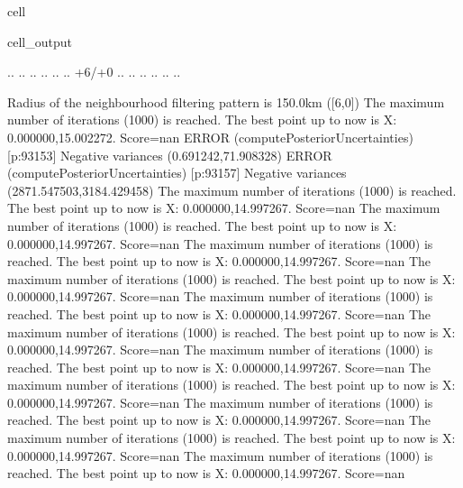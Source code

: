 \documentclass[letterpaper,10pt,english]{jupyterBook}
\begin{document}
\begin{sphinxuseclass}{cell}
\begin{sphinxVerbatimOutput}
\begin{sphinxuseclass}{cell_output}
\begin{sphinxVerbatim}[commandchars=\\\{\}]
 .\PYGZus{}\PYGZus{}\PYGZus{}\PYGZus{}\PYGZus{}. .\PYGZus{}\PYGZus{}\PYGZus{}\PYGZus{}\PYGZus{}. .\PYGZus{}\PYGZus{}\PYGZus{}\PYGZus{}\PYGZus{}. .\PYGZus{}\PYGZus{}\PYGZus{}\PYGZus{}\PYGZus{}. .\PYGZus{}\PYGZus{}\PYGZus{}\PYGZus{}\PYGZus{}. .\PYGZus{}\PYGZus{}\PYGZus{}\PYGZus{}\PYGZus{}. \PYGZob{}+6/+0\PYGZcb{} .\PYGZus{}\PYGZus{}\PYGZus{}\PYGZus{}\PYGZus{}. .\PYGZus{}\PYGZus{}\PYGZus{}\PYGZus{}\PYGZus{}. .\PYGZus{}\PYGZus{}\PYGZus{}\PYGZus{}\PYGZus{}. .\PYGZus{}\PYGZus{}\PYGZus{}\PYGZus{}\PYGZus{}. .\PYGZus{}\PYGZus{}\PYGZus{}\PYGZus{}\PYGZus{}. .\PYGZus{}\PYGZus{}\PYGZus{}\PYGZus{}\PYGZus{}. 



	Radius of the neighbourhood filtering pattern is 150.0km ([\PYGZhy{}6,0])
The maximum number of iterations (1000) is reached. The best point up to now is X: \PYGZob{}0.000000,15.002272\PYGZcb{}. Score=\PYGZhy{}nan
ERROR (compute\PYGZus{}Posterior\PYGZus{}Uncertainties) [p:93153] Negative variances (\PYGZhy{}0.691242,71.908328)
ERROR (compute\PYGZus{}Posterior\PYGZus{}Uncertainties) [p:93157] Negative variances (2871.547503,\PYGZhy{}3184.429458)
The maximum number of iterations (1000) is reached. The best point up to now is X: \PYGZob{}0.000000,14.997267\PYGZcb{}. Score=\PYGZhy{}nan
The maximum number of iterations (1000) is reached. The best point up to now is X: \PYGZob{}0.000000,14.997267\PYGZcb{}. Score=\PYGZhy{}nan
The maximum number of iterations (1000) is reached. The best point up to now is X: \PYGZob{}0.000000,14.997267\PYGZcb{}. Score=\PYGZhy{}nan
The maximum number of iterations (1000) is reached. The best point up to now is X: \PYGZob{}0.000000,14.997267\PYGZcb{}. Score=\PYGZhy{}nan
The maximum number of iterations (1000) is reached. The best point up to now is X: \PYGZob{}0.000000,14.997267\PYGZcb{}. Score=\PYGZhy{}nan
The maximum number of iterations (1000) is reached. The best point up to now is X: \PYGZob{}0.000000,14.997267\PYGZcb{}. Score=\PYGZhy{}nan
The maximum number of iterations (1000) is reached. The best point up to now is X: \PYGZob{}0.000000,14.997267\PYGZcb{}. Score=\PYGZhy{}nan
The maximum number of iterations (1000) is reached. The best point up to now is X: \PYGZob{}0.000000,14.997267\PYGZcb{}. Score=\PYGZhy{}nan
The maximum number of iterations (1000) is reached. The best point up to now is X: \PYGZob{}0.000000,14.997267\PYGZcb{}. Score=\PYGZhy{}nan
The maximum number of iterations (1000) is reached. The best point up to now is X: \PYGZob{}0.000000,14.997267\PYGZcb{}. Score=\PYGZhy{}nan
The maximum number of iterations (1000) is reached. The best point up to now is X: \PYGZob{}0.000000,14.997267\PYGZcb{}. Score=\PYGZhy{}nan

\end{sphinxVerbatim}
\end{sphinxuseclass}
\end{sphinxVerbatimOutput}
\end{sphinxuseclass}
\end{document}
